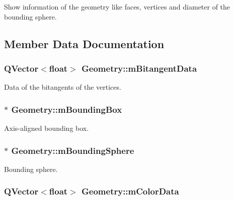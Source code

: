 Show information of the geometry like faces, vertices and diameter of the bounding sphere. 



\subsection{Member Data Documentation}
\hypertarget{class_geometry_a965032c7634b3aaea165ffb1e9549b82}{
\subsubsection[{m\+Bitangent\+Data}]{\setlength{\rightskip}{0pt plus 5cm}Q\+Vector$<$float$>$ Geometry\+::m\+Bitangent\+Data\hspace{0.3cm}{\ttfamily [private]}}}\label{class_geometry_a965032c7634b3aaea165ffb1e9549b82}


Data of the bitangents of the vertices. 

\hypertarget{class_geometry_a8094cba464c4943a478092b73f7364f9}{
\subsubsection[{m\+Bounding\+Box}]{$\ast$ Geometry\+::m\+Bounding\+Box\hspace{0.3cm}{\ttfamily [private]}}}\label{class_geometry_a8094cba464c4943a478092b73f7364f9}


Axis-\/aligned bounding box. 

\hypertarget{class_geometry_a8dba41b46c1f6b4006a96449157b3357}{
\subsubsection[{m\+Bounding\+Sphere}]{$\ast$ Geometry\+::m\+Bounding\+Sphere\hspace{0.3cm}{\ttfamily [private]}}}\label{class_geometry_a8dba41b46c1f6b4006a96449157b3357}


Bounding sphere. 

\hypertarget{class_geometry_ad7e8ca05ff8a0629af98afedc5935b29}{
\subsubsection[{m\+Color\+Data}]{\setlength{\rightskip}{0pt plus 5cm}Q\+Vector$<$float$>$ Geometry\+::m\+Color\+Data\hspace{0.3cm}{\ttfamily [private]}}}\label{class_geometry_ad7e8ca05ff8a0629af98afedc5935b29}



